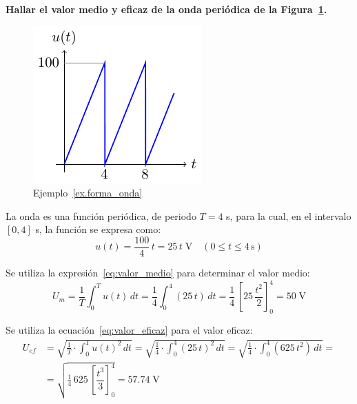\begin{example}\label{ex.forma_onda}
  \textbf{Hallar el valor medio y eficaz de la onda periódica de la
    Figura~\ref{fig:forma_onda}.}
  \begin{figure}[H]
    \centering \includegraphics{../figs/ejemplo_forma_onda.pdf}
    \caption{Ejemplo~\ref{ex.forma_onda}}
    \label{fig:forma_onda}
  \end{figure}
	    
  La onda es una función periódica, de periodo $T=4$ s, para la cual,
  en el intervalo $[0,4]$ s, la función se expresa como:
  \begin{equation*}
    u(t)=\dfrac{100}{4}\,t=25\,t\;\si{\volt} \quad (0\leq t\leq 4\,\text{s})
  \end{equation*}
	    
  Se utiliza la expresión~\eqref{eq:valor_medio} para determinar el
  valor medio:
  \begin{equation*}
    U_m=\dfrac{1}{T}\int_0^T u(t)\,dt=\dfrac{1}{4}\int_0^4 (25\,t)\,dt=\dfrac{1}{4}\,\left[25\,\dfrac{t^2}{2} \right]_0^4={50}\;\si{\volt}
  \end{equation*}
	    
  Se utiliza la ecuación~\eqref{eq:valor_eficaz} para el valor eficaz:
  \begin{align*}
    U_{ef}&=\sqrt{\frac{1}{T}\cdot\int_{0}^{T}u(t)^{2}\, dt}=\sqrt{\frac{1}{4}\cdot\int_{0}^{4}(25\,t)^{2}\, dt}=\sqrt{\frac{1}{4}\cdot\int_{0}^{4}(625\,t^2)\, dt}=\\
          &=\sqrt{\frac{1}{4}\, 625\,\left[\dfrac{t^3}{3}\right]_0^4}={57.74}\;\si{\volt}
  \end{align*}
\end{example}
	

